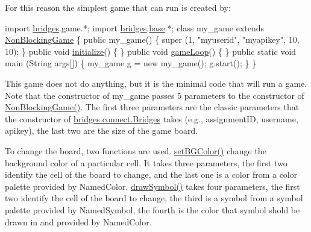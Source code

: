 For this reason the simplest game that can run is created by\+:


\begin{DoxyCode}
\textcolor{keyword}{import} \mbox{\hyperlink{namespacebridges}{bridges}}.game.*;
\textcolor{keyword}{import} \mbox{\hyperlink{namespacebridges}{bridges}}.\mbox{\hyperlink{namespacebridges_1_1base}{base}}.*;
\textcolor{keyword}{class }my\_game \textcolor{keyword}{extends} \mbox{\hyperlink{classbridges_1_1games_1_1_non_blocking_game_ae85ea8dcc355372ba354f4e26323fb76}{NonBlockingGame}} \{
  \textcolor{keyword}{public} my\_game() \{ super (1, \textcolor{stringliteral}{"myuserid"},  \textcolor{stringliteral}{"myapikey"}, 10, 10); \}
  \textcolor{keyword}{public} \textcolor{keywordtype}{void} \mbox{\hyperlink{classbridges_1_1games_1_1_game_base_a973a52d5eee7c29b01d668fba3c61657}{initialize}}()  \{ \}
  \textcolor{keyword}{public} \textcolor{keywordtype}{void} \mbox{\hyperlink{classbridges_1_1games_1_1_game_base_a56d05ed744791cfc1c3792f39ff438f1}{gameLoop}}()  \{ \}
  \textcolor{keyword}{public} \textcolor{keyword}{static} \textcolor{keywordtype}{void}  main (String args[]) \{
    my\_game g = \textcolor{keyword}{new} my\_game();
    g.start();
  \}
\}
\end{DoxyCode}


This game does not do anything, but it is the minimal code that will run a game. Note that the constructor of my\+\_\+game passes 5 parameters to the constructor of \mbox{\hyperlink{classbridges_1_1games_1_1_non_blocking_game_ae85ea8dcc355372ba354f4e26323fb76}{Non\+Blocking\+Game()}}. The first three parameters are the classic parameters that the constructor of \mbox{\hyperlink{classbridges_1_1connect_1_1_bridges}{bridges.\+connect.\+Bridges}} takes (e.\+g., assignment\+ID, username, apikey), the last two are the size of the game board.

To change the board, two functions are used. \mbox{\hyperlink{classbridges_1_1games_1_1_game_base_a7b4d08cdb306a5bf7104ab5315acb414}{set\+B\+G\+Color()}} change the background color of a particular cell. It takes three parameters, the first two identify the cell of the board to change, and the last one is a color from a color palette provided by Named\+Color. \mbox{\hyperlink{classbridges_1_1games_1_1_game_base_a03e8446feb00d5957a7e160a4fa76342}{draw\+Symbol()}} takes four parameters, the first two identify the cell of the board to change, the third is a symbol from a symbol palette provided by Named\+Symbol, the fourth is the color that symbol shold be drawn in and provided by Named\+Color.

